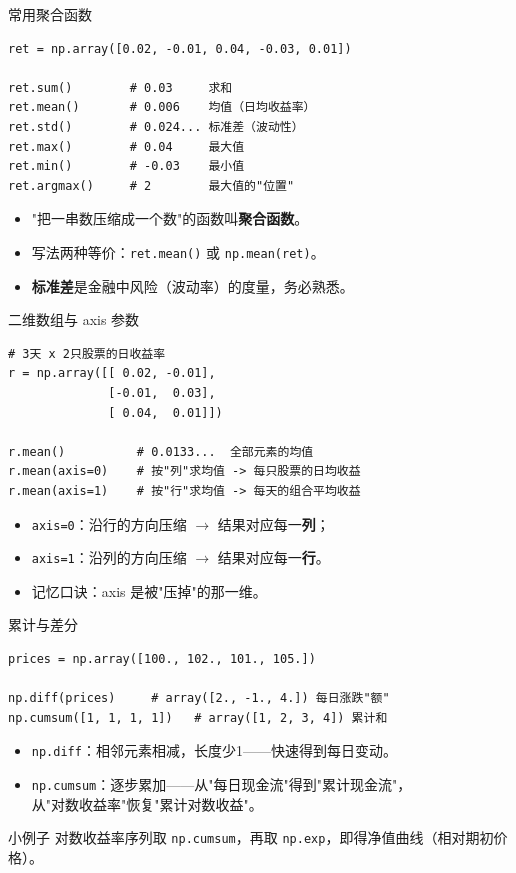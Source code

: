 \documentclass[9pt]{ctexbeamer}
\begin{document}
\begin{frame}[fragile]{常用聚合函数}
	\begin{lstlisting}
ret = np.array([0.02, -0.01, 0.04, -0.03, 0.01])

ret.sum()        # 0.03     求和
ret.mean()       # 0.006    均值（日均收益率）
ret.std()        # 0.024... 标准差（波动性）
ret.max()        # 0.04     最大值
ret.min()        # -0.03    最小值
ret.argmax()     # 2        最大值的"位置"
\end{lstlisting}
	\begin{itemize}
		\item "把一串数压缩成一个数"的函数叫\textbf{聚合函数}。
		\item 写法两种等价：\texttt{ret.mean()} 或 \texttt{np.mean(ret)}。
		\item \textbf{标准差}是金融中风险（波动率）的度量，务必熟悉。
	\end{itemize}
\end{frame}

\begin{frame}[fragile]{二维数组与 axis 参数}
	\begin{lstlisting}
# 3天 x 2只股票的日收益率
r = np.array([[ 0.02, -0.01],
              [-0.01,  0.03],
              [ 0.04,  0.01]])

r.mean()          # 0.0133...  全部元素的均值
r.mean(axis=0)    # 按"列"求均值 -> 每只股票的日均收益
r.mean(axis=1)    # 按"行"求均值 -> 每天的组合平均收益
\end{lstlisting}
	\begin{itemize}
		\item \texttt{axis=0}：沿行的方向压缩 $\rightarrow$ 结果对应每一\textbf{列}；
		\item \texttt{axis=1}：沿列的方向压缩 $\rightarrow$ 结果对应每一\textbf{行}。
		\item 记忆口诀：\alert{axis 是被"压掉"的那一维}。
	\end{itemize}
\end{frame}

\begin{frame}[fragile]{累计与差分}
	\begin{lstlisting}
prices = np.array([100., 102., 101., 105.])

np.diff(prices)     # array([2., -1., 4.]) 每日涨跌"额"
np.cumsum([1, 1, 1, 1])   # array([1, 2, 3, 4]) 累计和
\end{lstlisting}
	\begin{itemize}
		\item \texttt{np.diff}：相邻元素相减，长度少1——快速得到每日变动。
		\item \texttt{np.cumsum}：逐步累加——从"每日现金流"得到"累计现金流"，\\
			从"对数收益率"恢复"累计对数收益"。
	\end{itemize}
	\begin{exampleblock}{小例子}
		对数收益率序列取 \texttt{np.cumsum}，再取 \texttt{np.exp}，即得净值曲线（相对期初价格）。
	\end{exampleblock}
\end{frame}
\end{document}
